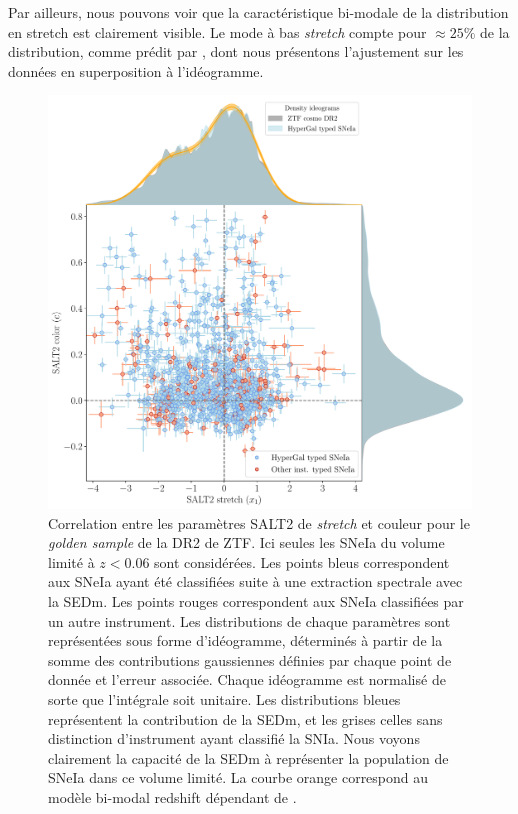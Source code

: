 \documentclass[../main/main.tex]{subfiles}
\begin{document}
Par ailleurs, nous pouvons voir que la caractéristique bi-modale
de la distribution en stretch est clairement visible. Le mode à bas
\textit{stretch} compte pour $\approx25\%$ de la distribution, comme prédit par
\citet{NoraNicolas21}, dont nous présentons l'ajustement sur les données
en superposition à l'idéogramme.
\begin{figure}[ht]
  \centering
  \includegraphics[width=1.1\textwidth]{../figures/09_dr2/stretch_color_driftmodel_dr2}
  \caption[Correlation entre les paramètres SALT2 de \textit{stretch} et
  couleur dans l'échantillon à volume limité.]{ Correlation entre les paramètres SALT2 de \textit{stretch} et
    couleur pour le \textit{golden sample} de la DR2 de ZTF. Ici seules les SNeIa du
    volume limité à $z<0.06$ sont considérées. Les points bleus 
    correspondent aux SNeIa ayant été classifiées suite à une extraction
    spectrale avec la SEDm. Les points rouges
    correspondent aux SNeIa classifiées par un autre instrument. Les
    distributions de chaque paramètres sont représentées sous forme
    d'idéogramme, déterminés à partir de la
    somme des contributions gaussiennes définies par chaque point de donnée
    et l'erreur associée. Chaque idéogramme est normalisé de sorte que l'intégrale
    soit unitaire. Les distributions bleues représentent la contribution de
    la SEDm, et les grises celles sans distinction d'instrument ayant
    classifié la SNIa. Nous voyons clairement la capacité de la SEDm à représenter la population de SNeIa
    dans ce volume limité. La courbe orange correspond au modèle bi-modal
    redshift dépendant de \citet{NoraNicolas21}.}
  \label{fig:ztfdr2saltcorr}
\end{figure}
\end{document}
